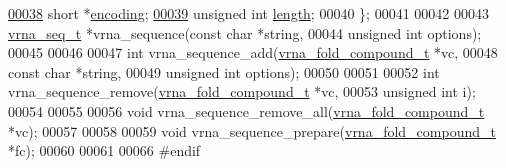 \begin{DoxyCode}
\hyperlink{structvrna__sequence__s_a8010ad82da6766e859e6f25e275a1d89}{00038}   \textcolor{keywordtype}{short}           *\hyperlink{structvrna__sequence__s_a8010ad82da6766e859e6f25e275a1d89}{encoding};  
\hyperlink{structvrna__sequence__s_af60876d93312ce0b842574a14c3a9cdd}{00039}   \textcolor{keywordtype}{unsigned} \textcolor{keywordtype}{int}    \hyperlink{structvrna__sequence__s_af60876d93312ce0b842574a14c3a9cdd}{length};     
00040 \};
00041 
00042 
00043 \hyperlink{structvrna__sequence__s}{vrna\_seq\_t} *vrna\_sequence(\textcolor{keyword}{const} \textcolor{keywordtype}{char}    *\textcolor{keywordtype}{string},
00044                           \textcolor{keywordtype}{unsigned} \textcolor{keywordtype}{int}  options);
00045 
00046 
00047 \textcolor{keywordtype}{int}           vrna\_sequence\_add(\hyperlink{group__fold__compound_structvrna__fc__s}{vrna\_fold\_compound\_t}  *vc,
00048                                 \textcolor{keyword}{const} \textcolor{keywordtype}{char}            *\textcolor{keywordtype}{string},
00049                                 \textcolor{keywordtype}{unsigned} \textcolor{keywordtype}{int}          options);
00050 
00051 
00052 \textcolor{keywordtype}{int}           vrna\_sequence\_remove(\hyperlink{group__fold__compound_structvrna__fc__s}{vrna\_fold\_compound\_t} *vc,
00053                                    \textcolor{keywordtype}{unsigned} \textcolor{keywordtype}{int}         i);
00054 
00055 
00056 \textcolor{keywordtype}{void}          vrna\_sequence\_remove\_all(\hyperlink{group__fold__compound_structvrna__fc__s}{vrna\_fold\_compound\_t} *vc);
00057 
00058 
00059 \textcolor{keywordtype}{void}          vrna\_sequence\_prepare(\hyperlink{group__fold__compound_structvrna__fc__s}{vrna\_fold\_compound\_t} *fc);
00060 
00061 
00066 \textcolor{preprocessor}{#endif}
\end{DoxyCode}
